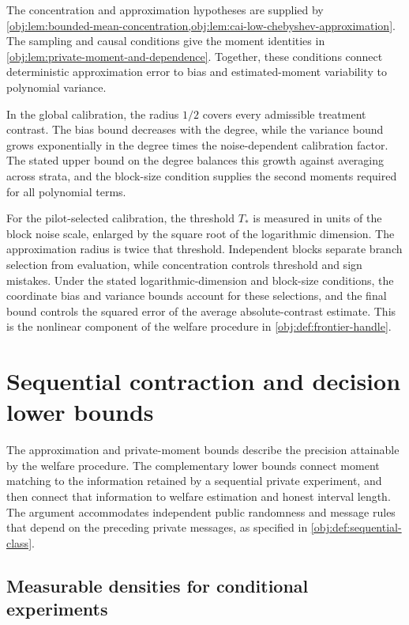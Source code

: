 \documentclass[11pt]{article}
\begin{document}
The concentration and approximation hypotheses are supplied by \cref{obj:lem:bounded-mean-concentration,obj:lem:cai-low-chebyshev-approximation}. The sampling and causal conditions give the moment identities in \cref{obj:lem:private-moment-and-dependence}. Together, these conditions connect deterministic approximation error to bias and estimated-moment variability to polynomial variance.

In the global calibration, the radius \(1/2\) covers every admissible treatment contrast. The bias bound decreases with the degree, while the variance bound grows exponentially in the degree times the noise-dependent calibration factor. The stated upper bound on the degree balances this growth against averaging across strata, and the block-size condition supplies the second moments required for all polynomial terms.

For the pilot-selected calibration, the threshold \(T_*\) is measured in units of the block noise scale, enlarged by the square root of the logarithmic dimension. The approximation radius is twice that threshold. Independent blocks separate branch selection from evaluation, while concentration controls threshold and sign mistakes. Under the stated logarithmic-dimension and block-size conditions, the coordinate bias and variance bounds account for these selections, and the final bound controls the squared error of the average absolute-contrast estimate. This is the nonlinear component of the welfare procedure in \cref{obj:def:frontier-handle}.


\section{Sequential contraction and decision lower bounds}

The approximation and private-moment bounds describe the precision attainable by the welfare procedure. The complementary lower bounds connect moment matching to the information retained by a sequential private experiment, and then connect that information to welfare estimation and honest interval length. The argument accommodates independent public randomness and message rules that depend on the preceding private messages, as specified in \cref{obj:def:sequential-class}.

\subsection{Measurable densities for conditional experiments}
\end{document}
